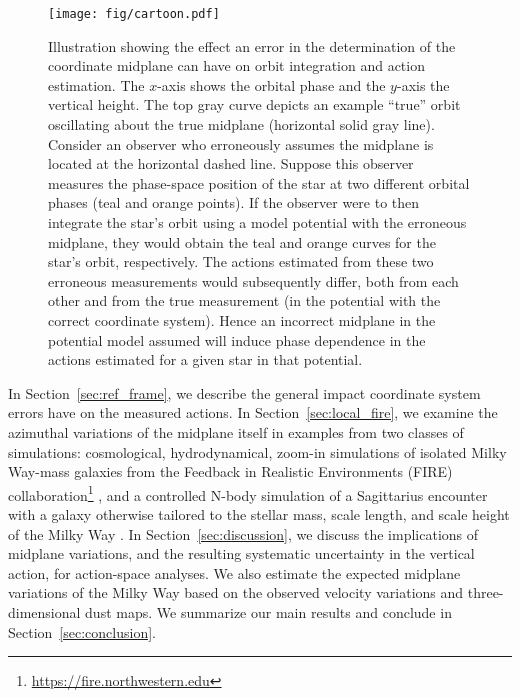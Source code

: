 \documentclass[twocolumn]{aastex62}
\begin{document}
\begin{figure*}[ht!]
\begin{center}
\texttt{[image: fig/cartoon.pdf]}
\end{center}
\caption{Illustration showing the effect an error in the determination
of the coordinate midplane can have on orbit integration and action
estimation. The $x$-axis shows the orbital phase and the $y$-axis the vertical
height. The top gray curve depicts an example ``true'' orbit oscillating about
the true midplane (horizontal solid gray line). Consider an observer who
erroneously assumes the midplane is located at the horizontal dashed line.
Suppose this observer measures the phase-space position of the star at two
different orbital phases (teal and orange points). If the observer were to
then integrate the star's orbit using a model potential with the erroneous
midplane, they would obtain the teal and orange curves for the star's orbit,
respectively. The actions estimated from these two erroneous measurements
would subsequently differ, both from each other and from the true measurement
(in the potential with the correct coordinate system). Hence an incorrect
midplane in the potential model assumed will induce phase dependence in the
actions estimated for a given star in that potential.} \label{fig:cartoon}
\end{figure*}

In Section~\ref{sec:ref_frame}, we describe the general impact coordinate
system errors have on the measured actions. In Section~\ref{sec:local_fire},
we examine the azimuthal variations of the midplane itself in examples from
two classes of simulations: cosmological, hydrodynamical, zoom-in simulations
of isolated Milky Way-mass galaxies from the Feedback in Realistic
Environments (FIRE)
collaboration\footnote{\url{https://fire.northwestern.edu}}
\citep{2014MNRAS.445..581H, 2016ApJ...827L..23W, 2018MNRAS.480..800H}, and a
controlled N-body simulation of a Sagittarius encounter with a galaxy
otherwise tailored to the stellar mass, scale length, and scale height of the
Milky Way \citep{2018MNRAS.481..286L}. In Section~\ref{sec:discussion}, we
discuss the implications of midplane variations, and the resulting systematic
uncertainty in the vertical action, for action-space analyses. We also
estimate the expected midplane variations of the Milky Way based on the
observed velocity variations and three-dimensional dust maps. We summarize our
main results and conclude in Section~\ref{sec:conclusion}.
\end{document}
